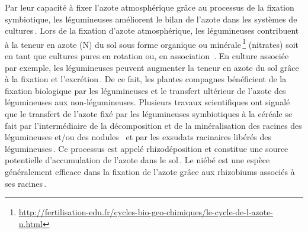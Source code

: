 \documentclass[a4paper,11pt]{article}
\begin{document}
Par leur capacité à fixer l'azote atmosphérique grâce au processus de
la fixation symbiotique, les légumineuses améliorent le bilan de
l'azote dans les systèmes de
cultures\,\cite{Ndakidemi_2005,Fustec11}. Lors de la fixation d'azote
atmosphérique, les légumineuses contribuent à la teneur en azote (N)
du sol sous forme organique ou
minérale\,\footnote{\url{http://fertilisation-edu.fr/cycles-bio-geo-chimiques/le-cycle-de-l-azote-n.html}}
(nitrates) soit en tant que cultures pures en rotation ou, en
association \,\cite{Bado_2006,Chu_2004,Makoi_2009,Ndakidemi_2005}. En
culture associée par exemple, les légumineuses peuvent augmenter la
teneur en azote du sol grâce à la fixation et
l'excrétion\,\cite{Trenbath_1976,Fustec11}. De ce fait, les plantes
compagnes bénéficient de la fixation biologique par les légumineuses
et le transfert ultérieur de l'azote des légumineuses aux
non-légumineuses. Plusieurs travaux scientifiques ont signalé que le
transfert de l'azote fixé par les légumineuses symbiotiques à la
céréale se fait par l'intermédiaire de la décomposition et de la
minéralisation des racines des légumineuses et/ou des nodules
\,\cite{Burity_1989} et par les exsudats racinaires libérés des
légumineuses\,\cite{Ndakidemi_2005,Makoi_2009}. Ce processus est
appelé rhizodéposition\cite{Fustec11} et constitue une source
potentielle d'accumulation de l'azote dans le
sol\,\cite{Koulibi_FideleZONGO}. Le niébé est une espèce généralement
efficace dans la fixation de l'azote grâce aux rhizobiums associés à
ses racines\,\cite{TRAORE_2009}.

\newpage

 
  
\end{document}
